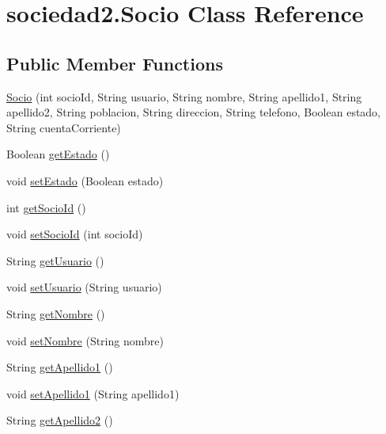 \hypertarget{classsociedad2_1_1_socio}{}\section{sociedad2.\+Socio Class Reference}
\label{classsociedad2_1_1_socio}
\subsection*{Public Member Functions}
\begin{DoxyCompactItemize}
\item 
\mbox{\hyperlink{classsociedad2_1_1_socio_a115644bad315b519368f61e5a4b761cd}{Socio}} (int socio\+Id, String usuario, String nombre, String apellido1, String apellido2, String poblacion, String direccion, String telefono, Boolean estado, String cuenta\+Corriente)
\item 
Boolean \mbox{\hyperlink{classsociedad2_1_1_socio_a3e0a22d240ae0ad0646fd753cc16d1ec}{get\+Estado}} ()
\item 
void \mbox{\hyperlink{classsociedad2_1_1_socio_aacec5199da027c329fbb1836e524c0fa}{set\+Estado}} (Boolean estado)
\item 
int \mbox{\hyperlink{classsociedad2_1_1_socio_a90990705fb988f1372f480e48138a92e}{get\+Socio\+Id}} ()
\item 
void \mbox{\hyperlink{classsociedad2_1_1_socio_ad41e542f71e29f595bddea81e1064fc0}{set\+Socio\+Id}} (int socio\+Id)
\item 
String \mbox{\hyperlink{classsociedad2_1_1_socio_a6a102064814f7634ad69f1543634c967}{get\+Usuario}} ()
\item 
void \mbox{\hyperlink{classsociedad2_1_1_socio_acf29bf517cefc7087b4d1e385e9da862}{set\+Usuario}} (String usuario)
\item 
String \mbox{\hyperlink{classsociedad2_1_1_socio_ae934c6a307188c82c399735a42982579}{get\+Nombre}} ()
\item 
void \mbox{\hyperlink{classsociedad2_1_1_socio_aa15275f5ee8e2173249d29600c6615f4}{set\+Nombre}} (String nombre)
\item 
String \mbox{\hyperlink{classsociedad2_1_1_socio_a29fb75c0c6ee59d395df5b7c72ea5352}{get\+Apellido1}} ()
\item 
void \mbox{\hyperlink{classsociedad2_1_1_socio_ac369f758c3a627def2a30e48df272485}{set\+Apellido1}} (String apellido1)
\item 
String \mbox{\hyperlink{classsociedad2_1_1_socio_a65cf03b87061bd1e976ec8139b48fdd3}{get\+Apellido2}} ()

\end{DoxyCompactItemize}
